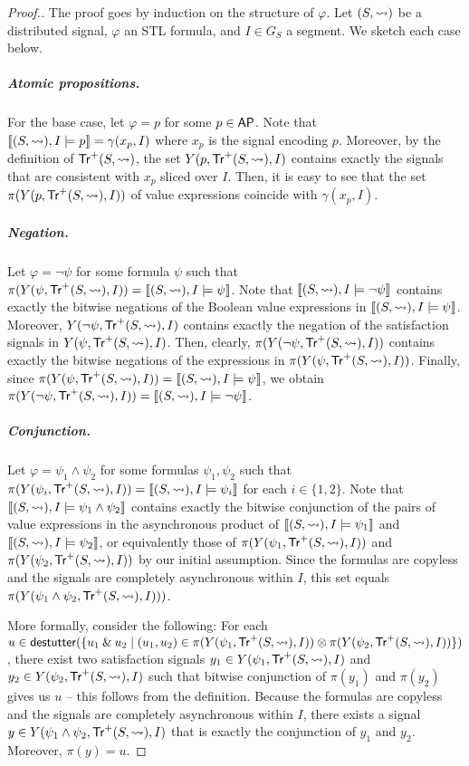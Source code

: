 \begin{proof}[\normalsize Proof.]
	\normalsize
	The proof goes by induction on the structure of $\varphi$.
	Let $(S,{\rightsquigarrow})$ be a distributed signal, $\varphi$ an STL formula, and $I \in G_S$ a segment.
	We sketch each case below.
	
	\subparagraph*{Atomic propositions.}
	For the base case, let $\varphi = p$ for some $p \in \mathsf{AP}$.
	Note that $\llbracket (S, {\rightsquigarrow}), I \models p \rrbracket = \gamma(x_p, I)$ where $x_p$ is the signal encoding $p$.
	Moreover, by the definition of $\mathsf{Tr}^+(S,{\rightsquigarrow})$, the set $Y(p, \mathsf{Tr}^+(S,{\rightsquigarrow}), I)$ contains exactly the signals that are consistent with $x_p$ sliced over $I$.
	Then, it is easy to see that the set $\pi(Y(p, \mathsf{Tr}^+(S,{\rightsquigarrow}), I))$ of value expressions coincide with $\gamma(x_p, I)$.
	
	\subparagraph*{Negation.}
	Let $\varphi = \lnot \psi$ for some formula $\psi$ such that $\pi(Y(\psi, \mathsf{Tr}^+(S,{\rightsquigarrow}), I)) = \llbracket (S,{\rightsquigarrow}), I \models \psi \rrbracket$.
	Note that $\llbracket (S,{\rightsquigarrow}), I \models \lnot \psi \rrbracket$ contains exactly the bitwise negations of the Boolean value expressions in $\llbracket (S,{\rightsquigarrow}), I \models \psi \rrbracket$.
	Moreover, $Y(\lnot\psi, \mathsf{Tr}^+(S,{\rightsquigarrow}), I)$ contains exactly the negation of the satisfaction signals in $Y(\psi, \mathsf{Tr}^+(S,{\rightsquigarrow}), I)$.
	Then, clearly, $\pi(Y(\lnot\psi, \mathsf{Tr}^+(S,{\rightsquigarrow}), I))$ contains exactly the bitwise negations of the expressions in $\pi(Y(\psi, \mathsf{Tr}^+(S,{\rightsquigarrow}), I))$.
	Finally, since $\pi(Y(\psi, \mathsf{Tr}^+(S,{\rightsquigarrow}), I)) = \llbracket (S,{\rightsquigarrow}), I \models \psi \rrbracket$, we obtain $\pi(Y(\lnot\psi, \mathsf{Tr}^+(S,{\rightsquigarrow}), I)) = \llbracket (S,{\rightsquigarrow}), I \models \lnot\psi \rrbracket$.
	
	\subparagraph*{Conjunction.}
	Let $\varphi = \psi_1 \land \psi_2$ for some formulas $\psi_1, \psi_2$ such that $\pi(Y(\psi_i, \mathsf{Tr}^+(S,{\rightsquigarrow}), I)) = \llbracket (S,{\rightsquigarrow}), I \models \psi_i \rrbracket$ for each $i \in \{1,2\}$.
	Note that $\llbracket (S,{\rightsquigarrow}), I \models \psi_1 \land \psi_2 \rrbracket$ contains exactly the bitwise conjunction of the pairs of value expressions in the asynchronous product of $\llbracket (S,{\rightsquigarrow}), I \models \psi_1 \rrbracket$ and $\llbracket (S,{\rightsquigarrow}), I \models \psi_2 \rrbracket$, or equivalently those of $\pi(Y(\psi_1, \mathsf{Tr}^+(S,{\rightsquigarrow}), I))$ and $\pi(Y(\psi_2, \mathsf{Tr}^+(S,{\rightsquigarrow}), I))$ by our initial assumption.
	Since the formulas are copyless and the signals are completely asynchronous within $I$, this set equals $\pi(Y(\psi_1 \land \psi_2, \mathsf{Tr}^+(S,{\rightsquigarrow}), I)))$.
	
	More formally, consider the following:
	For each $u \in \destutter(\{ u_1 \BitAnd u_2 \st (u_1,u_2) \in \pi(Y(\psi_1, \tr^+(S,{\hb}), I)) \otimes \pi(Y(\psi_2, \tr^+(S,{\hb}), I))\})$, there exist two satisfaction signals $y_1 \in Y(\psi_1, \mathsf{Tr}^+(S,{\rightsquigarrow}), I)$ and $y_2 \in Y(\psi_2, \mathsf{Tr}^+(S,{\rightsquigarrow}), I)$ such that bitwise conjunction of $\pi(y_1)$ and $\pi(y_2)$ gives us $u$ -- this follows from the definition.
	Because the formulas are copyless and the signals are completely asynchronous within $I$, there exists a signal $y \in Y(\psi_1 \land \psi_2, \mathsf{Tr}^+(S,{\rightsquigarrow}), I)$ that is exactly the conjunction of $y_1$ and $y_2$.
	Moreover, $\pi(y) = u$.
	

\end{proof}
